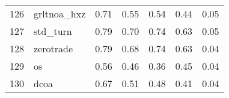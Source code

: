 \documentclass[12pt]{article}
\begin{document}
\begin{footnotesize}
\begin{longtable}{rl|c|c|c|c|c}
				126                  & grltnoa\_hxz                & 0.71                             & 0.55                                                                                          & 0.54                                                                                          & 0.44                                                                                          & 0.05                                                                                                   \\
				127                  & std\_turn                   & 0.79                             & 0.70                                                                                          & 0.74                                                                                          & 0.63                                                                                          & 0.05                                                                                                   \\
				128                  & zerotrade                   & 0.79                             & 0.68                                                                                          & 0.74                                                                                          & 0.63                                                                                          & 0.04                                                                                                   \\
				129                  & os                          & 0.56                             & 0.46                                                                                          & 0.36                                                                                          & 0.45                                                                                          & 0.04                                                                                                   \\
				130                  & dcoa                        & 0.67                             & 0.51                                                                                          & 0.48                                                                                          & 0.41                                                                                          & 0.04                                                                                                   \\

\end{longtable}
\end{footnotesize}
\end{document}
